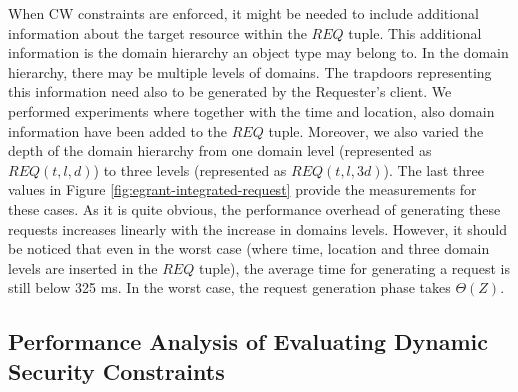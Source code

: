 \documentclass[epsfig,a4paper,11pt,titlepage]{book}
\numberwithin{algorithm}{chapter}
\begin{document}
When \gls{CW} constraints are enforced, it might be needed to include additional information about the target resource within the $\mathit{REQ}$ tuple. This additional information is the domain hierarchy an object type may belong to. In the domain hierarchy, there may be multiple levels of domains. The trapdoors representing this information need also to be generated by the Requester's client. We performed experiments where together with the time and location, also domain information have been added to the $\mathit{REQ}$ tuple. Moreover, we also varied the depth of the domain hierarchy from one domain level (represented as $\mathit{REQ}(t,l,d)$) to three levels (represented as $\mathit{REQ}(t,l,3d)$). The last three values in Figure \ref{fig:egrant-integrated-request} provide the measurements for these cases. As it is quite obvious, the performance overhead of generating these requests increases linearly with the increase in domains levels. However, it should be noticed that even in the worst case (where time, location and three domain levels are inserted in the $\mathit{REQ}$ tuple), the average time for generating a request is still below 325 \gls{ms}. In the worst case, the request generation phase takes ${\Theta}( Z )$.

\subsection{Performance Analysis of Evaluating Dynamic Security Constraints}
\end{document}
